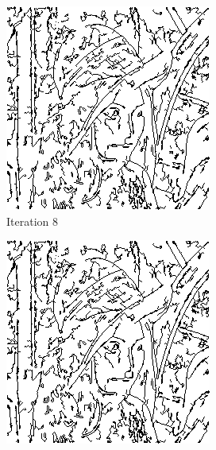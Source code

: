 \documentclass{llncs}
\begin{document}
\begin{figure}
        \begin{subfigure}[b]{0.3\textwidth}
                \includegraphics[width=\textwidth]{IMG/RandomInit/Iteration8}
                \caption{Iteration 8}
                \label{fig:rand_iter8}
        \end{subfigure}
        \quad
        \begin{subfigure}[b]{0.3\textwidth}
                \includegraphics[width=\textwidth]{IMG/RandomInit/Iteration9}

\end{subfigure}
\end{figure}
\end{document}
